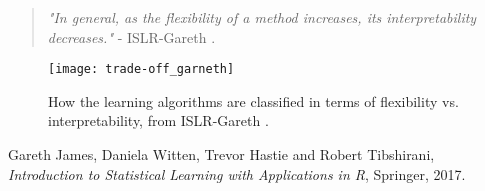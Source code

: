 \documentclass[a4paper,11pt]{article}
\begin{document}
  \begin{quotation}
    \textit{"In general, as the flexibility of a method increases, its interpretability decreases."} - ISLR-Gareth \cite{gareth}.
  \end{quotation}

\begin{figure}[h]
  \texttt{[image: trade-off\_garneth]}
  \caption{How the learning algorithms are classified in terms of flexibility vs. interpretability, from ISLR-Gareth \cite{gareth}.}
  \label{}
\end{figure}

\begin{thebibliography}{99}
  Gareth James, Daniela Witten, Trevor Hastie and Robert Tibshirani,
  \textit{Introduction to Statistical Learning with Applications in R},
  Springer,
  2017.

\end{thebibliography}
\end{document}

